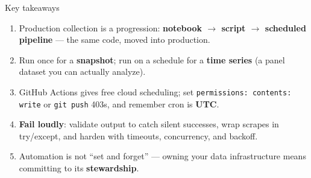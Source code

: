 \documentclass[9pt,aspectratio=169]{beamer}
\begin{document}
\begin{frame}{Key takeaways}
    \begin{enumerate}
        \item Production collection is a progression: \textbf{notebook $\rightarrow$ script $\rightarrow$ scheduled pipeline} --- the same code, moved into production.
        \item Run once for a \textbf{snapshot}; run on a schedule for a \textbf{time series} (a panel dataset you can actually analyze).
        \item GitHub Actions gives free cloud scheduling; set \texttt{permissions: contents: write} or \texttt{git push} 403s, and remember cron is \textbf{UTC}.
        \item \textbf{Fail loudly}: validate output to catch silent successes, wrap scrapes in try/except, and harden with timeouts, concurrency, and backoff.
        \item Automation is not ``set and forget'' --- owning your data infrastructure means committing to its \textbf{stewardship}.
    \end{enumerate}
    \vspace{1em}
\end{frame}
\end{document}
